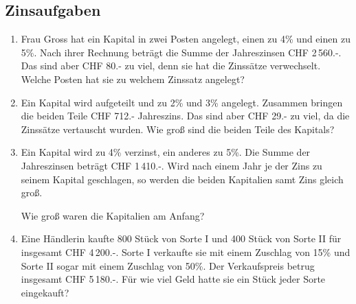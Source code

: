 \subsection{Zinsaufgaben}
\begin{enumerate}[label=\alph*)]
\item
Frau Gross hat ein Kapital in zwei Posten angelegt, einen zu 4\% und
einen zu 5\%. Nach ihrer Rechnung beträgt die Summe der Jahreszinsen
CHF 2\,560.-. Das sind aber CHF 80.- zu viel, denn sie hat die
Zinssätze verwechselt. Welche Posten hat sie zu welchem Zinssatz
angelegt?

\item

Ein Kapital wird aufgeteilt und zu 2\% und 3\% angelegt. Zusammen
bringen die beiden Teile CHF 712.- Jahreszins. Das sind aber CHF 29.-
zu viel, da die Zinssätze vertauscht wurden. Wie groß sind die beiden
Teile des Kapitals?

\item
Ein Kapital wird zu 4\% verzinst, ein anderes zu 5\%. Die Summe der
Jahreszinsen beträgt CHF 1\,410.-. Wird nach einem Jahr je der Zins zu
seinem Kapital geschlagen, so werden die beiden Kapitalien samt Zins
gleich groß.

Wie groß waren die Kapitalien am Anfang?

\item
Eine Händlerin kaufte 800 Stück von Sorte I und 400 Stück von Sorte II
für insgesamt CHF 4\,200.-. Sorte I verkaufte sie mit einem Zuschlag
von 15\% und Sorte II sogar mit einem Zuschlag von 50\%. Der
Verkaufspreis betrug insgesamt CHF 5\,180.-. Für wie viel Geld hatte
sie ein Stück jeder Sorte eingekauft?


\end{enumerate}
\newpage

